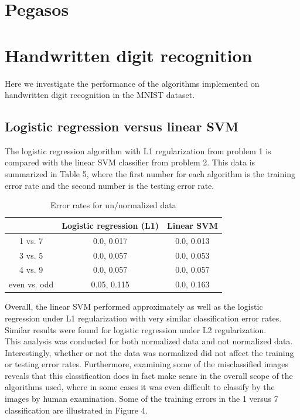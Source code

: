 \documentclass{article}
\begin{document}
\section{Pegasos}

\section{Handwritten digit recognition}
Here we investigate the performance of the algorithms implemented on handwritten digit recognition in the MNIST dataset.

\subsection{Logistic regression versus linear SVM}

The logistic regression algorithm with L1 regularization from problem 1 is compared with the linear SVM classifier from problem 2. This data is summarized in Table 5, where the first number for each algorithm is the training error rate and the second number is the testing error rate. \\

\begin{table}
  \begin{center}
    \begin{tabular}{ | c | c | c | }
      \hline
                     & Logistic regression (L1)    & Linear SVM            \\ \hline
      1 vs. 7        & 0.0, 0.017                  & 0.0, 0.013            \\ \hline
      3 vs. 5        & 0.0, 0.057                  & 0.0, 0.053            \\ \hline
      4 vs. 9        & 0.0, 0.057                  & 0.0, 0.057            \\ \hline
      even vs. odd   & 0.05, 0.115                 & 0.0, 0.163            \\ \hline
    \end{tabular}
  \end{center}
  \caption{Error rates for un/normalized data}
\end{table}

Overall, the linear SVM performed approximately as well as the logistic regression under L1 regularization with very similar classification error rates. Similar results were found for logistic regression under L2 regularization. \\

This analysis was conducted for both normalized data and not normalized data. Interestingly, whether or not the data was normalized did not affect the training or testing error rates. Furthermore, examining some of the misclassified images reveals that this classification does in fact make sense in the overall scope of the algorithms used, where in some cases it was even difficult to classify by the images by human examination. Some of the training errors in the 1 versus 7 classification are illustrated in Figure 4.
\end{document}
